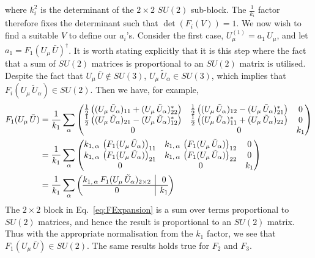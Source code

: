 %
where $k_i^2$ is the determinant of the $2\times 2$ $SU(2)$ sub-block. The $\frac{1}{k_i}$ factor therefore fixes the determinant such that $\det(F_i(V))=1$. We now wish to find a suitable $V$ to define our $a_i$'s. Consider the first case, $U^{(1)}_\mu = a_1\,U_\mu$, and let $a_1 = F_1(U_\mu\,\bar{U})^\dagger$. It is worth stating explicitly that it is this step where the fact that a sum of $SU(2)$ matrices is proportional to an $SU(2)$ matrix is utilised. Despite the fact that $U_\mu\,\bar{U} \notin SU(3)$, $U_\mu \, \tilde{U}_\alpha\in SU(3)$, which implies that $F_i(U_\mu\, \tilde{U}_\alpha)\in SU(2)$. Then we have, for example,
%
\begin{align}
F_1(U_\mu \, \bar{U}) &= \frac{1}{k_1}\sum_\alpha
\begin{pmatrix}
\frac{1}{2}\left((U_\mu \, \tilde{U}_\alpha)_{11} + (U_\mu \, \tilde{U}_\alpha)^*_{22}\right) & \frac{1}{2}\left((U_\mu \, \tilde{U}_\alpha)_{12} - (U_\mu \, \tilde{U}_\alpha)^*_{21}\right) & 0\\
\frac{1}{2}\left((U_\mu \, \tilde{U}_\alpha)_{21} - (U_\mu \, \tilde{U}_\alpha)^*_{12}\right) & \frac{1}{2}\left((U_\mu \, \tilde{U}_\alpha)^*_{11} + (U_\mu \, \tilde{U}_\alpha)_{22}\right) & 0\\
0 & 0 & k_1
\end{pmatrix}\nonumber\\
&=\frac{1}{k_1}\sum_\alpha
\begin{pmatrix}
k_{1,\,\alpha}\,\left(F_1(U_\mu\,\tilde{U}_\alpha)\right)_{11} & k_{1,\,\alpha}\,\left(F_1(U_\mu\,\tilde{U}_\alpha)\right)_{12} & 0\\
k_{1,\,\alpha}\,\left(F_1(U_\mu\,\tilde{U}_\alpha)\right)_{21} & k_{1,\,\alpha}\,\left(F_1(U_\mu\,\tilde{U}_\alpha)\right)_{22} & 0\\
0 & 0 & k_1
\end{pmatrix}\nonumber\\
&=\frac{1}{k_1}\sum_\alpha
\left(\begin{array}{@{}c|c@{}}
k_{1,\,\alpha} \,F_1(U_\mu\,\tilde{U}_\alpha)_{2\times 2} & 0\\
  \hline 
0 & k_1
\end{array}\right)
\label{eq:FExpansion}
\end{align}
%
The $2\times 2$ block in Eq.~\ref{eq:FExpansion} is a sum over terms proportional to $SU(2)$ matrices, and hence the result is proportional to an $SU(2)$ matrix. Thus with the appropriate normalisation from the $k_1$ factor, we see that $F_1(U_\mu \, \bar{U})\in SU(2)$. The same results holds true for $F_2$ and $F_3$.\\

